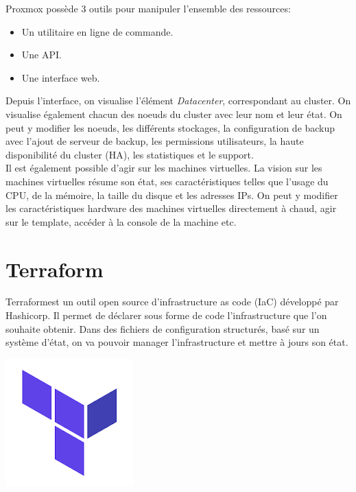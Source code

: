 \documentclass[12pt]{article}
\begin{document}
\begin{minipage}{.53\textwidth}%
\gls{Proxmox} possède 3 outils pour manipuler l'ensemble des ressources:
 \begin{itemize}
     \item Un utilitaire en ligne de commande.
     \item Une \gls{API}.
     \item Une interface web.
 \end{itemize}

Depuis l'interface, on visualise l'élément \textit{Datacenter}, correspondant au \gls{cluster}. 
On visualise également chacun des noeuds du \gls{cluster} avec leur nom et leur état. 
On peut y modifier les noeuds, les différents stockages, la configuration de backup avec l'ajout de serveur de backup, les permissions utilisateurs, la haute disponibilité du cluster (HA), les statistiques et le support. \\

Il est également possible d'agir sur les machines virtuelles. 
La vision sur les machines virtuelles résume son état, ses caractéristiques telles que l'usage du CPU, de la mémoire, la taille du disque et les adresses IPs. 
On peut y modifier les caractéristiques hardware des machines virtuelles directement à chaud, agir sur le template, accéder à la console de la machine etc. \\
\end{minipage}%

\newpage
\section{Terraform}
\noindent%
\begin{minipage}{.7\textwidth}%
\gls{Terraform}est un outil open source d'infrastructure as code (\gls{IaC}) développé par Hashicorp. 
Il permet de déclarer sous forme de code l'infrastructure que l'on souhaite obtenir. 
Dans des fichiers de configuration structurés, basé sur un système d'état, on va pouvoir manager l'infrastructure et mettre à jours son état. \\

\end{minipage}%
\hfill
\begin{minipage}{.3\textwidth}%
\begin{center}
\includegraphics[scale=0.5]{src/logo_terraform.png}
\end{center}
\end{minipage}%
\end{document}
